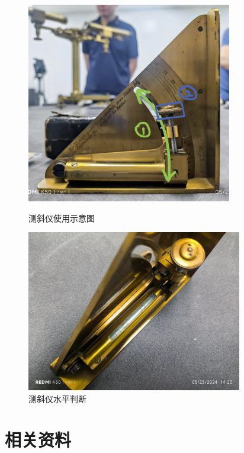 \documentclass[UTF8]{ctexart}
\begin{document}
\begin{figure}[h]
    \centering
    \begin{minipage}[t]{0.4\textwidth}
        \centering
        \includegraphics[width=0.8\textwidth]{img/clinometer_usage_adjust.jpg}
        \caption{测斜仪使用示意图}
        \label{fig:clinometer_usage_adjust}
    \end{minipage}
    \begin{minipage}[t]{0.5\textwidth}
        \centering
        \includegraphics[width=0.84\textwidth]{img/clinometer_usage_judge.jpg}
        \caption{测斜仪水平判断}
        \label{fig:clinometer_usage_judge}
    \end{minipage}
\end{figure}

\section{相关资料}
\end{document}

